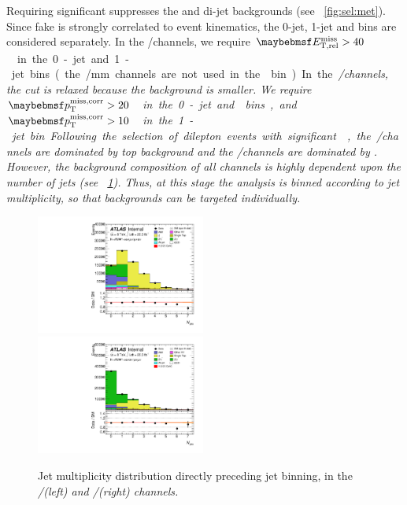Requiring significant \met suppresses the \DYll and di-jet backgrounds (see 
\Figure~\ref{fig:sel:met}). Since fake \met is strongly correlated to event kinematics, 
the 0-jet, 1-jet and \twojet bins are considered separately. In the \ee/\mm channels, we 
require \unit{$\metrel > 40$}{\GeV} in the 0-jet and 1-jet bins (the \ee/\mm channels 
are not used in the \twojet bin). In the \em/\me channels, the \met cut is relaxed 
because the \DYll background is smaller. We require \unit{$\corrtrackmet > 20$}{\GeV} in 
the 0-jet and \twojet bins, and \unit{$\corrtrackmet > 10$}{\GeV} in the 1-jet bin.

Following the selection of dilepton events with significant \met, the \em/\me channels 
are dominated by top background and the \ee/\mm channels are dominated by \DYll. 
However, the background composition of all channels is highly dependent upon the number 
of jets (see \Figure~\ref{fig:sel:njets}). Thus, at this stage the analysis is binned 
according to jet multiplicity, so that backgrounds can be targeted individually.

\begin{figure}
	\includegraphics[width=0.495\textwidth]{tex/selection/emme_CutMETRel_m_jet_n_upTo7_mh125_lin}
	\hfill
	\includegraphics[width=0.495\textwidth]{tex/selection/eemm_CutMETRel_m_jet_n_upTo7_mh125_lin}
	\caption{Jet multiplicity distribution directly preceding jet binning, in the 
	\em/\me (left) and \ee/\mm (right) channels.}
	\label{fig:sel:njets}
\end{figure}



